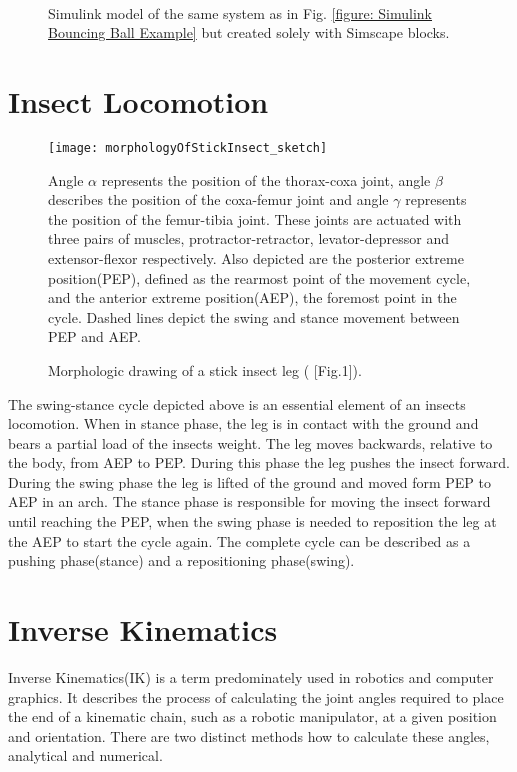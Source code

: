 \begin{figure}[h]
	\centering
	\centerline{}
	\
	\caption{Simulink model of the same system as in Fig. \ref{figure: Simulink Bouncing Ball Example} but created solely with Simscape blocks.}
	\label{figure: Simscape Bouncing Ball Example}
\end{figure}

\section{Insect Locomotion}

\begin{figure}[h]
	\centerline{\texttt{[image: morphologyOfStickInsect\_sketch]}}
	\caption{Morphologic drawing of a stick insect leg (\cite{schilling2013walknet} [Fig.1]).}
	\begin{footnotesize}
		Angle $\alpha$ represents the position of the thorax-coxa joint, angle $\beta$ describes the position of the coxa-femur joint and angle $\gamma$ represents the position of the femur-tibia joint.
		These joints are actuated with three pairs of muscles, protractor-retractor, levator-depressor and extensor-flexor respectively.
		Also depicted are the posterior extreme position(PEP), defined as the rearmost point of the movement cycle, and the anterior extreme position(AEP), the foremost point in the cycle.
		Dashed lines depict the swing and stance movement between PEP and AEP.
	\end{footnotesize}
	
	\label{figure: Stick insect leg}
\end{figure}

The swing-stance cycle depicted above is an essential element of an insects locomotion.
When in stance phase, the leg is in contact with the ground and bears a partial load of the insects weight.
The leg moves backwards, relative to the body, from AEP to PEP. During this phase the leg pushes the insect forward.
During the swing phase the leg is lifted of the ground and moved form PEP to AEP in an arch.
The stance phase is responsible for moving the insect forward until reaching the PEP, when the swing phase is needed to reposition the leg at the AEP to start the cycle again.
The complete cycle can be described as a pushing phase(stance) and a repositioning phase(swing).



\section{Inverse Kinematics}
Inverse Kinematics(IK) is a term predominately used in robotics and computer graphics.
It describes the process of calculating the joint angles required to place the end of a kinematic chain, such as a robotic manipulator, at a given position and orientation.
There are two distinct methods how to calculate these angles, analytical and numerical.

